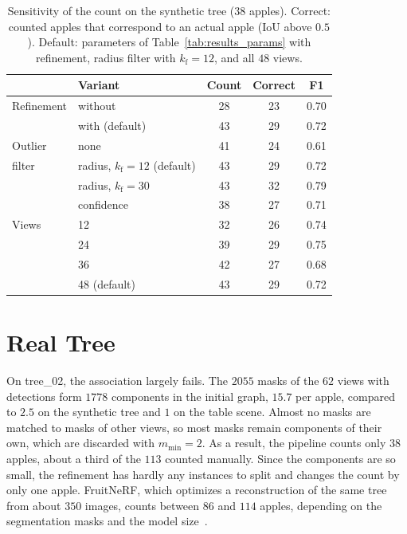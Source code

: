 \documentclass[english, egger, bsc]{vcethesis}
\begin{document}
\begin{table}[tbp]
    \centering
    \caption{Sensitivity of the count on the synthetic tree ($38$
    apples). Correct: counted apples that correspond to an actual apple
    (IoU above $0.5$). Default: parameters of
    Table~\ref{tab:results_params} with refinement, radius filter with
    $k_{\mathrm{f}} = 12$, and all $48$ views.}
    \label{tab:results_sensitivity}
    \small
    \begin{tabular}{llccc}
        \toprule
        & Variant & Count & Correct & F1 \\
        \midrule
        Refinement & without           & 28 & 23 & 0.70 \\
                   & with (default)    & 43 & 29 & 0.72 \\
        \midrule
        Outlier    & none              & 41 & 24 & 0.61 \\
        filter     & radius, $k_{\mathrm{f}} = 12$ (default)
                                       & 43 & 29 & 0.72 \\
                   & radius, $k_{\mathrm{f}} = 30$
                                       & 43 & 32 & 0.79 \\
                   & confidence        & 38 & 27 & 0.71 \\
        \midrule
        Views      & 12                & 32 & 26 & 0.74 \\
                   & 24                & 39 & 29 & 0.75 \\
                   & 36                & 42 & 27 & 0.68 \\
                   & 48 (default)      & 43 & 29 & 0.72 \\
        \bottomrule
    \end{tabular}
\end{table}

\section{Real Tree}
\label{sec:results_tree02}
On tree\_02, the association largely fails. The $2055$ masks of the $62$ views with detections form $1778$ components in the initial graph, $15.7$ per apple, compared to $2.5$ on the synthetic tree and $1$ on the table scene. Almost no masks are matched to masks of other views, so most masks remain components of their own, which are discarded with $m_{\min} = 2$. As a result, the pipeline counts only $38$ apples, about a third of the $113$ counted manually. Since the components are so small, the refinement has hardly any instances to split and changes the count by only one apple. FruitNeRF, which optimizes a reconstruction of the same tree from about $350$ images, counts between $86$ and $114$ apples, depending on the segmentation masks and the model size~\cite{meyer2024fruitnerf}.
\end{document}

